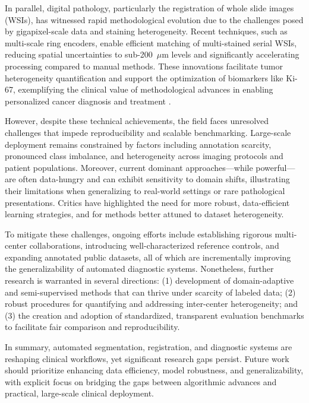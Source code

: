 \documentclass[sigconf]{acmart}
\begin{document}
In parallel, digital pathology, particularly the registration of whole slide images (WSIs), has witnessed rapid methodological evolution due to the challenges posed by gigapixel-scale data and staining heterogeneity. Recent techniques, such as multi-scale ring encoders, enable efficient matching of multi-stained serial WSIs, reducing spatial uncertainties to sub-200~$\mu$m levels and significantly accelerating processing compared to manual methods. These innovations facilitate tumor heterogeneity quantification and support the optimization of biomarkers like Ki-67, exemplifying the clinical value of methodological advances in enabling personalized cancer diagnosis and treatment \cite{ref94}.

However, despite these technical achievements, the field faces unresolved challenges that impede reproducibility and scalable benchmarking. Large-scale deployment remains constrained by factors including annotation scarcity, pronounced class imbalance, and heterogeneity across imaging protocols and patient populations. Moreover, current dominant approaches—while powerful—are often data-hungry and can exhibit sensitivity to domain shifts, illustrating their limitations when generalizing to real-world settings or rare pathological presentations. Critics have highlighted the need for more robust, data-efficient learning strategies, and for methods better attuned to dataset heterogeneity.

To mitigate these challenges, ongoing efforts include establishing rigorous multi-center collaborations, introducing well-characterized reference controls, and expanding annotated public datasets, all of which are incrementally improving the generalizability of automated diagnostic systems. Nonetheless, further research is warranted in several directions: (1) development of domain-adaptive and semi-supervised methods that can thrive under scarcity of labeled data; (2) robust procedures for quantifying and addressing inter-center heterogeneity; and (3) the creation and adoption of standardized, transparent evaluation benchmarks to facilitate fair comparison and reproducibility.

In summary, automated segmentation, registration, and diagnostic systems are reshaping clinical workflows, yet significant research gaps persist. Future work should prioritize enhancing data efficiency, model robustness, and generalizability, with explicit focus on bridging the gaps between algorithmic advances and practical, large-scale clinical deployment.
\end{document}
